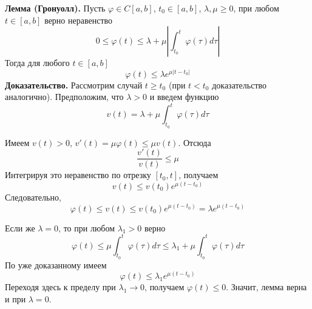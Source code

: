 \textbf{Лемма (Гронуолл).} Пусть $\varphi \in C[a,b]$, $t_0 \in [a,b]$, $\lambda, \mu \ge 0$, при любом $t \in [a,b]$ верно неравенство
\begin{equation*}
    0 \le \varphi(t) \le \lambda + \mu \left|\int_{t_0}^t \varphi(\tau)d\tau\right|
\end{equation*}
Тогда для любого $t \in [a,b]$
\begin{equation*}
    \varphi(t) \le \lambda e^{\mu|t - t_0|}
\end{equation*}
\textbf{Доказательство.} Рассмотрим случай $t \ge t_0$ (при $t < t_0$ доказательство аналогично). Предположим, что $\lambda > 0$ и введем функцию
\begin{equation*}
    v(t) = \lambda + \mu \int_{t_0}^t \varphi(\tau)d\tau
\end{equation*}

Имеем $v(t) > 0$, $v'(t) = \mu\varphi(t) \le \mu v(t)$. Отсюда
\begin{equation*}
    \frac{v'(t)}{v(t)} \le \mu
\end{equation*}
Интегрируя это неравенство по отрезку $[t_0, t]$, получаем
\begin{equation*}
    v(t) \le v(t_0)e^{\mu(t-t_0)}
\end{equation*}
Следовательно,
\begin{equation*}
    \varphi(t) \le v(t) \le v(t_0)e^{\mu(t-t_0)} = \lambda e^{\mu(t-t_0)}
\end{equation*}

Если же $\lambda = 0$, то при любом $\lambda_1 > 0$ верно
\begin{equation*}
    \varphi(t) \le \mu \int_{t_0}^t \varphi(\tau)d\tau \le \lambda_1 + \mu \int_{t_0}^t \varphi(\tau)d\tau
\end{equation*}
По уже доказанному имеем
\begin{equation*}
    \varphi(t) \le \lambda_1 e^{\mu (t - t_0)}
\end{equation*}
Переходя здесь к пределу при $\lambda_1 \to 0$, получаем $\varphi(t) \le 0$. Значит, лемма верна и при $\lambda = 0$.\\

